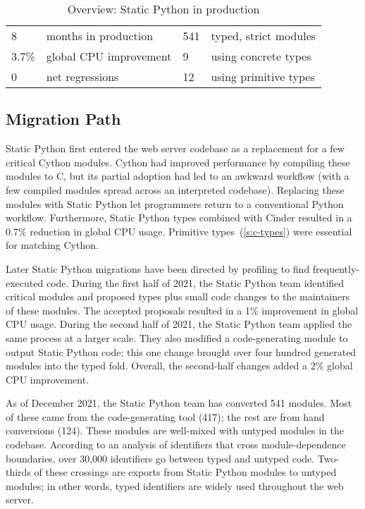 \documentclass[english,cleveref,submission]{programming}
\newcommand{\SP}{Static Python}
\newcommand{\CPUchange}{3.7\%}
\begin{document}
\begin{table}
  \caption{Overview: \SP{} in production}
  \label{t:prod-stat}
  \begin{tabular}{l@{~~}l@{\qquad}l@{~~}l}
    8     & months in production   & 541   & typed, strict modules \\
    \CPUchange{} & global CPU improvement &   9   & using concrete types \\
    0     & net regressions        &  12   & using primitive types \\
  \end{tabular}
\end{table}


\subsection{Migration Path}

\SP{} first entered the web server codebase as a replacement for a
few critical Cython modules.
Cython had improved performance by compiling these modules to C,
but its partial adoption had led to an awkward workflow (with a
few compiled modules spread across an interpreted codebase).
Replacing these modules with \SP{} let programmers return to a conventional
Python workflow.
Furthermore, \SP{} types combined with Cinder resulted in a
0.7\% reduction in global CPU usage.
Primitive types~(\cref{s:c-types}) were essential for matching Cython.

Later \SP{} migrations have been directed by profiling to find frequently-executed code.
During the first half of 2021, the \SP{} team identified critical
modules and proposed types plus small code changes to the maintainers of these modules.
The accepted proposals resulted in a 1\% improvement in global CPU usage.
During the second half of 2021, the \SP{} team applied the same
process at a larger scale.
They also modified a code-generating module to output \SP{} code;
this one change brought over four hundred generated modules into the typed fold.
Overall, the second-half changes added a 2\% global CPU improvement.

As of December 2021, the \SP{} team has converted 541 modules.
Most of these came from the code-generating tool (417); the rest
are from hand conversions (124).
These modules are well-mixed with untyped modules in the codebase.
According to an analysis of identifiers that cross module-dependence
boundaries, over 30,000 identifiers go between typed and untyped code.
Two-thirds of these crossings are exports from \SP{} modules
to untyped modules; in other words, typed identifiers are widely used
throughout the web server.
\end{document}
